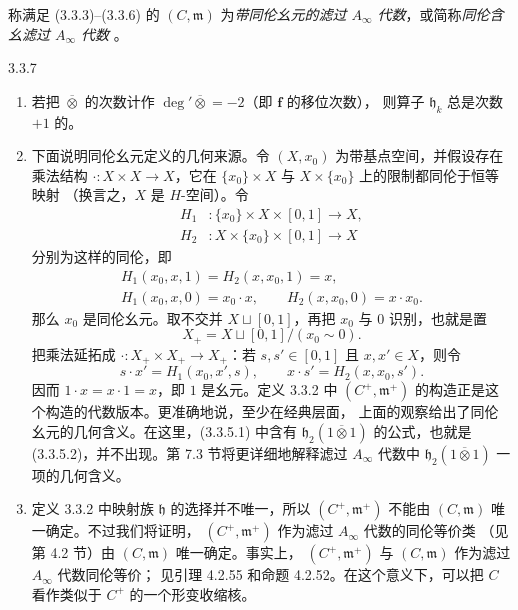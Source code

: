 称满足 (3.3.3)--(3.3.6) 的 $(C,\mathfrak m)$ 为\emph{带同伦幺元的滤过
$A_\infty$ 代数}，或简称\emph{同伦含幺滤过 $A_\infty$ 代数}
。

\begin{remark}{3.3.7}\label{rem:3-3-7}
\begin{enumerate}[label=\textup{(\arabic*)},leftmargin=2.8em]
  \item 若把 $\mathbin{\overline\otimes}$ 的次数计作
  $\deg'\mathbin{\overline\otimes}=-2$（即 $\mathbf f$ 的移位次数），
  则算子 $\mathfrak h_k$ 总是次数 $+1$ 的。

  \item 下面说明同伦幺元定义的几何来源。令 $(X,x_0)$ 为带基点空间，并假设存在
  乘法结构 $\mathord\cdot\colon X\times X\to X$，它在
  $\{x_0\}\times X$ 与 $X\times\{x_0\}$ 上的限制都同伦于恒等映射
  （换言之，$X$ 是 $H$-空间）。令
  \[
  \begin{aligned}
    H_1&\colon\{x_0\}\times X\times[0,1]\longrightarrow X,\\
    H_2&\colon X\times\{x_0\}\times[0,1]\longrightarrow X
  \end{aligned}
  \]
  分别为这样的同伦，即
  \[
  \begin{gathered}
    H_1(x_0,x,1)=H_2(x,x_0,1)=x,\\
    H_1(x_0,x,0)=x_0\mathbin{\cdot}x,\qquad
    H_2(x,x_0,0)=x\mathbin{\cdot}x_0.
  \end{gathered}
  \]
  那么 $x_0$ 是同伦幺元。取不交并 $X\sqcup[0,1]$，再把 $x_0$ 与 $0$
  识别，也就是置
  \[
    X_+=X\sqcup[0,1]/(x_0\sim0).
  \]
  把乘法延拓成 $\mathord\cdot\colon X_+\times X_+\to X_+$：若
  $s,s'\in[0,1]$ 且 $x,x'\in X$，则令
  \[
    s\mathbin{\cdot}x'=H_1(x_0,x',s),\qquad
    x\mathbin{\cdot}s'=H_2(x,x_0,s').
  \]
  因而 $1\cdot x=x\cdot1=x$，即 $1$ 是幺元。定义 3.3.2 中
  $(C^+,\mathfrak m^+)$ 的构造正是这个构造的代数版本。更准确地说，至少在经典层面，
  上面的观察给出了同伦幺元的几何含义。在这里，(3.3.5.1) 中含有
  $\mathfrak h_2(1\mathbin{\overline\otimes}1)$ 的公式，也就是
  (3.3.5.2)，并不出现。第 7.3 节将更详细地解释滤过 $A_\infty$ 代数中
  $\mathfrak h_2(1\mathbin{\overline\otimes}1)$ 一项的几何含义。

  \item 定义 3.3.2 中映射族 $\mathfrak h$ 的选择并不唯一，所以
  $(C^+,\mathfrak m^+)$ 不能由 $(C,\mathfrak m)$ 唯一确定。不过我们将证明，
  $(C^+,\mathfrak m^+)$ 作为滤过 $A_\infty$ 代数的同伦等价类
  （见第 4.2 节）由 $(C,\mathfrak m)$ 唯一确定。事实上，
  $(C^+,\mathfrak m^+)$ 与 $(C,\mathfrak m)$ 作为滤过 $A_\infty$ 代数同伦等价；
  见引理 4.2.55 和命题 4.2.52。在这个意义下，可以把 $C$ 看作类似于
  $C^+$ 的一个形变收缩核。
\end{enumerate}
\end{remark}

